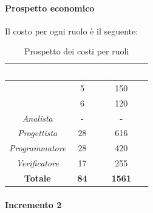 \paragraph*{Prospetto economico}
Il costo per ogni ruolo è il seguente:
\begin{table}[H]
	\begin{center}
		\begin{tabular}{ |c c c| }
			\rowcolor{darkblue} 
			\textcolor{white}{\textbf{Ruolo}} & \textcolor{white}{\textbf{Ore}} & \textcolor{white}{\textbf{Costo in €}}\\ \hline
		{\Responsabile} 			& 5 	& 150 \\ \hline
		{\Amministratore}		 	& 6 	& 120 \\ \hline
		\textit{Analista} 			& - 	& - \\ \hline
		\textit{Progettista} 		& 28 	& 616 \\ \hline
		\textit{Programmatore}  	& 28 	& 420 \\ \hline
		\textit{Verificatore} 		& 17 	& 255 \\ \hline
		\textbf{Totale} & \textbf{84} & \textbf{1561} \\ \hline
		\end{tabular}
		\caption{Prospetto dei costi per ruoli}
	\end{center}
\end{table}
\paragraph{Incremento 2}
